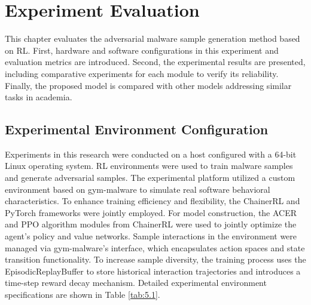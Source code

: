%
%
%
%
%

\chapter{Experiment Evaluation}

This chapter evaluates the adversarial malware sample generation method based on RL. First, hardware and software configurations in this experiment and evaluation metrics are introduced. Second, the experimental results are presented, including comparative experiments for each module to verify its reliability. Finally, the proposed model is compared with other models addressing similar tasks in academia.

\section{Experimental Environment Configuration}

Experiments in this research were conducted on a host configured with a 64-bit Linux operating system. RL environments were used to train malware samples and generate adversarial samples. The experimental platform utilized a custom environment based on gym-malware to simulate real software behavioral characteristics. To enhance training efficiency and flexibility, the ChainerRL and PyTorch frameworks were jointly employed. For model construction, the ACER and PPO algorithm modules from ChainerRL were used to jointly optimize the agent's policy and value networks. Sample interactions in the environment were managed via gym-malware's interface, which encapsulates action spaces and state transition functionality. To increase sample diversity, the training process uses the EpisodicReplayBuffer to store historical interaction trajectories and introduces a time-step reward decay mechanism. Detailed experimental environment specifications are shown in Table \ref{tab:5.1}.  

